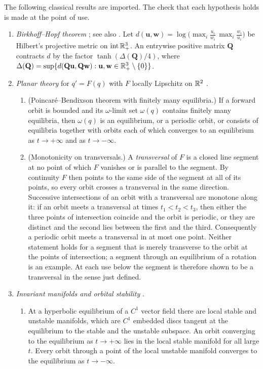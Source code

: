 The following classical results are imported. The check that each hypothesis holds is made at the point of use.
\begin{enumerate}[label=\textup{(I\arabic*)}]
\item \emph{Birkhoff--Hopf theorem} \cite{Birkhoff57,Bushell73}; see also \cite[Chapter~3]{Seneta81}. Let $d(\mathbf u,\mathbf w)=\log\bigl(\max_i\frac{u_i}{w_i}\,\max_i\frac{w_i}{u_i}\bigr)$ be Hilbert's projective metric on $\operatorname{int}\mathbb R^3_+$. An entrywise positive matrix $\mathbf Q$ contracts $d$ by the factor $\tanh(\Delta(\mathbf Q)/4)$, where $\Delta(\mathbf Q)=\sup\{d(\mathbf Q\mathbf u,\mathbf Q\mathbf w):\mathbf u,\mathbf w\in\mathbb R^3_+\setminus\{0\}\}$.
\item \emph{Planar theory} for $q'=F(q)$ with $F$ locally Lipschitz on $\mathbb R^2$ \cite[Chapter~VII]{Hartman02}.
\begin{enumerate}[label=\textup{(\alph*)}]
\item (Poincar\'e--Bendixson theorem with finitely many equilibria.) If a forward orbit is bounded and its $\omega$-limit set $\omega(q)$ contains finitely many equilibria, then $\omega(q)$ is an equilibrium, or a periodic orbit, or consists of equilibria together with orbits each of which converges to an equilibrium as $t\to+\infty$ and as $t\to-\infty$.
\item (Monotonicity on transversals.) A \emph{transversal} of $F$ is a closed line segment at no point of which $F$ vanishes or is parallel to the segment. By continuity $F$ then points to the same side of the segment at all of its points, so every orbit crosses a transversal in the same direction. Successive intersections of an orbit with a transversal are monotone along it: if an orbit meets a transversal at times $t_1<t_2<t_3$, then either the three points of intersection coincide and the orbit is periodic, or they are distinct and the second lies between the first and the third. Consequently a periodic orbit meets a transversal in at most one point. Neither statement holds for a segment that is merely transverse to the orbit at the points of intersection; a segment through an equilibrium of a rotation is an example. At each use below the segment is therefore shown to be a transversal in the sense just defined.
\end{enumerate}
\item \emph{Invariant manifolds and orbital stability} \cite[Chapter~IX]{Hartman02}.
\begin{enumerate}[label=\textup{(\alph*)}]
\item At a hyperbolic equilibrium of a $C^1$ vector field there are local stable and unstable manifolds, which are $C^1$ embedded discs tangent at the equilibrium to the stable and the unstable subspace. An orbit converging to the equilibrium as $t\to+\infty$ lies in the local stable manifold for all large $t$. Every orbit through a point of the local unstable manifold converges to the equilibrium as $t\to-\infty$.

\end{enumerate}
\end{enumerate}
